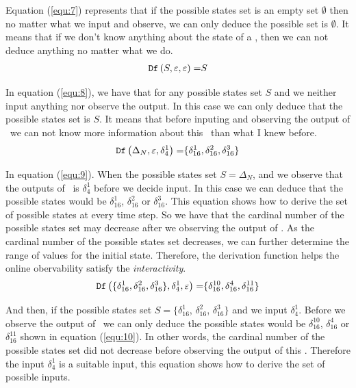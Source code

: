 Equation (\ref{equ:7}) represents that if the possible states set is an empty set $\emptyset$ then no matter what we input and observe, we can only deduce the possible set is $\emptyset$. It means that if we don't know anything about the state of a \BCN, then we can not deduce anything no matter what we do.
\begin{equation}
\begin{split}
{\tt Df}\left(S,\varepsilon,\varepsilon\right)=&S\\
\end{split}
\label{equ:8}
\end{equation}

 In equation (\ref{equ:8}), we have that for any possible states set $S$ and we neither input anything nor observe the output. In this case we can only deduce that the possible states set is $S$. It means that before inputing and observing the output of \BCN\ we can not know more information about this \BCN\ than what I knew before.
\begin{equation}
\begin{split}
{\tt Df}\left(\Delta_N,\varepsilon,\delta_4^1\right)=&\{\delta_{16}^1,\delta_{16}^2,\delta_{16}^3\}\\
\end{split}
\label{equ:9}
\end{equation}
 
In equation (\ref{equ:9}). When the possible states set $S=\Delta_N$, and  we observe that the outputs of \BCN\ is $\delta_4^1$ before we decide input. In this case we can deduce that the possible states would be $\delta_{16}^1$, $\delta_{16}^2$ or  $\delta_{16}^3$. This equation shows how to derive the set of possible states at every time step. So we have that the cardinal number of the possible states set may decrease after we observing the output of \BCN. As the cardinal number of the possible states set decreases, we can further determine the range of values for the initial state. Therefore, the derivation function helps the online obervability satisfy the {\em interactivity}.
\begin{equation}
\begin{split}
{\tt Df}\left(\{\delta_{16}^1,\delta_{16}^2,\delta_{16}^3\},\delta_4^1,\varepsilon\right)=&\{\delta_{16}^{10},\delta_{16}^4,\delta_{16}^{11}\}\\
\end{split}
\label{equ:10}
\end{equation}

And then, if the possible states set $S=\{\delta_{16}^1$, $\delta_{16}^2$, $\delta_{16}^3\}$ and we input $\delta_4^1$. Before we observe the output of \BCN\ we can only deduce the possible states would be $\delta_{16}^{10}$, $\delta_{16}^4$ or  $\delta_{16}^{11}$ shown in equation (\ref{equ:10}). In other words, the cardinal number of the possible states set did not decrease before observing the output of this \BCN. Therefore the input $\delta_4^1$ is a suitable input, this equation shows how to derive the set of possible inputs.

